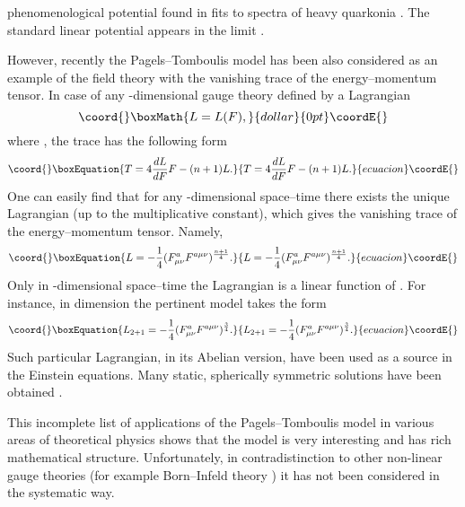 \documentclass[a4 paper, 12 pt] {article}
\begin{document}
phenomenological potential found in fits to spectra of heavy
quarkonia \cite{kacper1}. The standard linear potential appears in
the limit \myHighlight{$\delta \rightarrow \infty $}\coordHE{}.
\par
However, recently the Pagels--Tomboulis model has been also
considered as an example of the field theory with the vanishing
trace of the energy--momentum tensor. In case of any
\coordHE{}-dimensional gauge theory defined by a Lagrangian
$$\coord{}\boxMath{L=L(F),}{dollar}{0pt}\coordE{}$$ where \coordHE{}, the trace \coordHE{} has the following form
\begin{equation}\coord{}\boxEquation{
T= 4 \frac{ d L}{d F} F - (n+1) L.
\label{trace}
}{
T= 4 \frac{ d L}{d F} F - (n+1) L.
}{ecuacion}\coordE{}\end{equation}
One can easily find that for any \coordHE{}-dimensional space--time
there exists the unique Lagrangian (up to the
 multiplicative constant),
which gives the vanishing trace of the energy--momentum tensor.
Namely,
\begin{equation}\coord{}\boxEquation{
L= -\frac{1}{4}(F^a_{\mu \nu } F^{a \mu \nu })^{\frac{n+1}{4}}.
\label{tracelag}
}{
L= -\frac{1}{4}(F^a_{\mu \nu } F^{a \mu \nu })^{\frac{n+1}{4}}.
}{ecuacion}\coordE{}\end{equation}
Only in \coordHE{}-dimensional space--time the Lagrangian is a linear
function of \coordHE{}. For instance, in \coordHE{} dimension the pertinent
model takes the form
\begin{equation}\coord{}\boxEquation{
L_{2+1}=-\frac{1}{4} (F^a_{\mu \nu } F^{a \mu \nu
})^{\frac{3}{4}}. \label{lag2}
}{
L_{2+1}=-\frac{1}{4} (F^a_{\mu \nu } F^{a \mu \nu
})^{\frac{3}{4}}. }{ecuacion}\coordE{}\end{equation}
Such particular Lagrangian, in its Abelian version, have been used
as a source in the Einstein equations. Many static, spherically
symmetric solutions have been obtained \cite{Garcia}.
\par
This incomplete list of applications of the Pagels--Tomboulis model
in various areas of theoretical physics shows that the model is
very interesting and has rich mathematical structure.
Unfortunately, in contradistinction to other non-linear gauge theories
(for example Born--Infeld theory \cite{born}) it has not been
considered in the systematic way.
\newline
\end{document}
